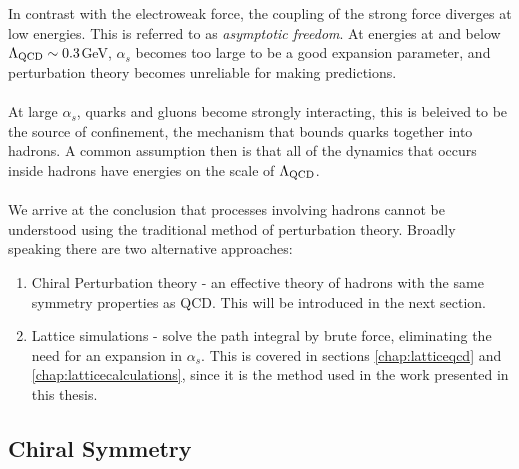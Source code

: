 In contrast with the electroweak force, the coupling of the strong force diverges at low energies. This is referred to as {\it{asymptotic freedom}}. At energies at and below $\Lambda_{\text{QCD}} \sim 0.3$GeV, $\alpha_s$ becomes too large to be a good expansion parameter, and perturbation theory becomes unreliable for making predictions.
\\ \\
At large $\alpha_s$, quarks and gluons become strongly interacting, this is beleived to be the source of confinement, the mechanism that bounds quarks together into hadrons. A common assumption then is that all of the dynamics that occurs inside hadrons have energies on the scale of $\Lambda_{\text{QCD}}$.
\\ \\
We arrive at the conclusion that processes involving hadrons cannot be understood using the traditional method of perturbation theory. Broadly speaking there are two alternative approaches:
\begin{enumerate}
\item
  Chiral Perturbation theory - an effective theory of hadrons with the same symmetry properties as QCD. This will be introduced in the next section.
\item
  Lattice simulations - solve the path integral by brute force, eliminating the need for an expansion in $\alpha_s$. This is covered in sections \ref{chap:latticeqcd} and \ref{chap:latticecalculations}, since it is the method used in the work presented in this thesis.
\end{enumerate}

\subsection{Chiral Symmetry}

